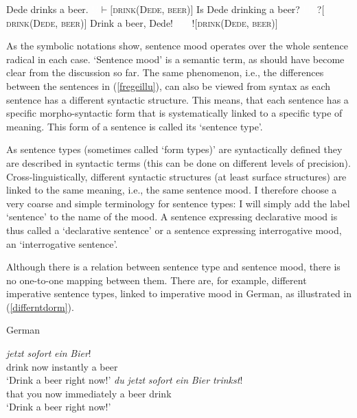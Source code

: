 \begin{exe}
\ex\label{fregeillu}\begin{xlist}
\ex Dede drinks a beer. \hfill {\textcolor{white}{!?}$\vdash$$[$\textsc{drink}(\textsc{Dede}, \textsc{beer})$]$} \label{fregeillustrationa}
\ex Is Dede drinking a beer? \hfill {\textcolor{white}{!$\vdash$}?$[$\textsc{drink}(\textsc{Dede}, \textsc{beer})$]$} \label{fregeillustrationb}
\ex Drink a beer, Dede! \hfill {\textcolor{white}{$\vdash$?}!$[$\textsc{drink}(\textsc{Dede}, \textsc{beer})$]$} \label{fregeillustrationc}
\end{xlist}
\end{exe}

\noindent As the symbolic notations show, sentence mood operates over the whole sentence radical in each case. `Sentence mood' is a semantic term, as should have become clear from the discussion so far. The same phenomenon, i.e., the differences between the sentences in (\ref{fregeillu}), can also be viewed from syntax as each sentence has a different syntactic structure. This means, that each sentence has a specific morpho-syntactic form that is systematically linked to a specific type of meaning. This form of a sentence is called its `sentence type'.

As sentence types (sometimes called `form types)' are syntactically defined they are described in syntactic terms (this can be done on different levels of precision). Cross-linguistically, different syntactic structures (at least surface structures) are linked to the same meaning, i.e., the same sentence mood. I therefore choose a very coarse and simple terminology for sentence types: I will simply add the label `sentence' to the name of the mood. A sentence expressing declarative mood is thus called a `declarative sentence' or a sentence expressing interrogative mood, an `interrogative sentence'.

Although there is a relation between sentence type and sentence mood, there is no one-to-one mapping between them. There are, for example, different imperative sentence types, linked to imperative mood in German, as illustrated in (\ref{differntdorm}).


\begin{exe}
\ex German \label{differntdorm}\begin{xlist}
\ex {} {\textit{jetzt}} {\textit{sofort}} {\textit{ein}} {\textit{Bier}!}  \\
{drink} {now} {instantly} {a} {beer} \\
\trans `Drink a beer right now!' \label{differentformtypesa}
\ex {} {\textit{du}} {\textit{jetzt}} {\textit{sofort}} {\textit{ein}} {\textit{Bier}} {\textit{trinkst}!}\\
{that} {you} {now} {immediately} {a} {beer} {drink} \\
\trans `Drink a beer right now!' \label{differentformtypesc}
\end{xlist}
\end{exe}

